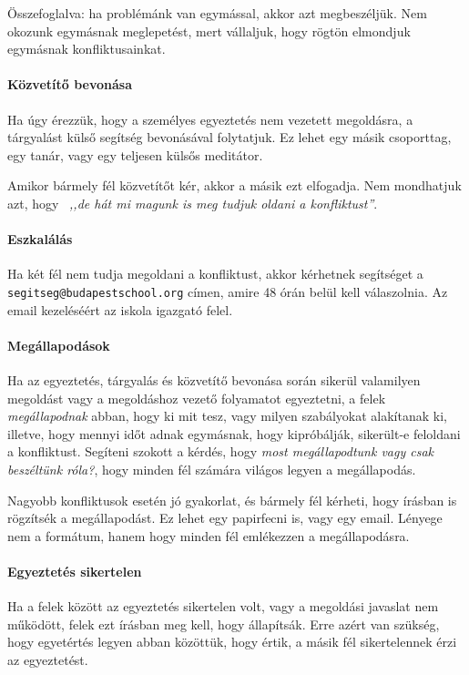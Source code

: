 Összefoglalva: ha problémánk van egymással, akkor azt megbeszéljük. Nem
okozunk egymásnak meglepetést, mert vállaljuk, hogy rögtön elmondjuk
egymásnak konfliktusainkat.

\paragraph{Közvetítő bevonása}

Ha úgy érezzük, hogy a személyes egyeztetés nem vezetett megoldásra, a
tárgyalást külső segítség bevonásával folytatjuk. Ez lehet egy másik
csoporttag, egy tanár, vagy egy teljesen külsős meditátor.

Amikor bármely fél közvetítőt kér, akkor a másik ezt elfogadja. Nem mondhatjuk
azt, hogy  \emph{,,de hát mi magunk is meg tudjuk oldani a konfliktust''}.

\paragraph{Eszkalálás}

Ha két fél nem tudja megoldani a konfliktust, akkor kérhetnek segítséget a
\texttt{segitseg@budapestschool.org}
címen, amire 48 órán belül kell válaszolnia. Az email kezeléséért az iskola
igazgató felel.

\paragraph{Megállapodások}

Ha az egyeztetés, tárgyalás és közvetítő bevonása során sikerül
valamilyen megoldást vagy a megoldáshoz vezető folyamatot egyeztetni, a
felek \emph{megállapodnak} abban, hogy ki mit tesz, vagy milyen szabályokat
alakítanak
ki, illetve, hogy mennyi időt adnak egymásnak, hogy kipróbálják, sikerült-e
feloldani a konfliktust.
Segíteni szokott a kérdés, hogy \emph{most megállapodtunk vagy csak beszéltünk
    róla?}, hogy minden fél számára világos legyen a megállapodás.

Nagyobb konfliktusok esetén jó gyakorlat, és bármely fél kérheti, hogy
írásban is rögzítsék a megállapodást. Ez lehet egy papirfecni is, vagy egy
email. Lényege nem a formátum, hanem  hogy minden fél emlékezzen a
megállapodásra.

\paragraph{Egyeztetés sikertelen}

Ha a felek között az egyeztetés sikertelen volt, vagy a megoldási
javaslat nem működött, felek ezt írásban meg kell, hogy állapítsák. Erre
azért van szükség, hogy egyetértés legyen abban közöttük, hogy értik, a
másik fél sikertelennek érzi az egyeztetést.

